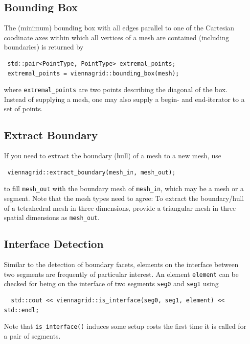 
 \subsection{Bounding Box}
 The (minimum) bounding box with all edges parallel to one of the Cartesian coodinate axes within which all vertices of a mesh are contained (including boundaries) is returned by
 \begin{lstlisting}
 std::pair<PointType, PointType> extremal_points;
 extremal_points = viennagrid::bounding_box(mesh);
 \end{lstlisting}
 where \lstinline|extremal_points| are two points describing the diagonal of the box.
 Instead of supplying a mesh, one may also supply a begin- and end-iterator to a set of points.

 \subsection{Extract Boundary}
 If you need to extract the boundary (hull) of a mesh to a new mesh, use
 \begin{lstlisting}
 viennagrid::extract_boundary(mesh_in, mesh_out);
 \end{lstlisting}
 to fill \lstinline|mesh_out| with the boundary mesh of \lstinline|mesh_in|, which may be a mesh or a segment.
 Note that the mesh types need to agree: To extract the boundary/hull of a tetrahedral mesh in three dimensions, provide a triangular mesh in three spatial dimensions as \lstinline|mesh_out|. 

 \subsection{Interface Detection}
  Similar to the detection of boundary facets, elements on the interface between two segments are frequently of particular interest.
  An element \lstinline|element| can be checked for being on the interface of two segments \lstinline|seg0| and \lstinline|seg1| using
 \begin{lstlisting}
  std::cout << viennagrid::is_interface(seg0, seg1, element) << std::endl;
 \end{lstlisting}
 Note that \lstinline|is_interface()| induces some setup costs the first time it is called for a pair of segments.

